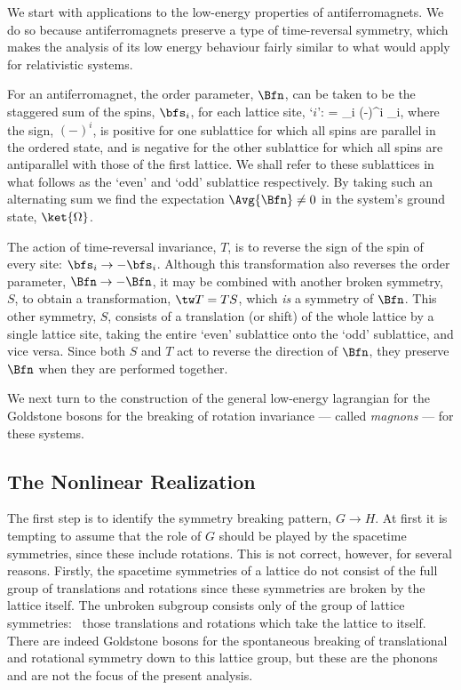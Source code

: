\documentclass[12pt,epsf]{report}
\begin{document}
We start with applications to the low-energy properties of
antiferromagnets. We do so because antiferromagnets
preserve a type of time-reversal symmetry, which makes the
analysis of its low energy behaviour fairly similar to what
would apply for relativistic systems.

For an antiferromagnet, the order parameter, $\Bfn$, can be
taken to be the staggered sum of the spins, $\bfs_i$, for
each lattice site, `$i$':
%
\eq
\label{aforderparam}
\Bfn = \sum_i (-)^i \; \bfs_i,
\eeq
%
where the sign, $(-)^i$, is positive for one sublattice for
which all spins are parallel in the ordered state, and is
negative for the other sublattice for which all spins are
antiparallel with those of the first lattice. We shall
refer to these sublattices in what follows as the `even'
and `odd' sublattice respectively. By taking such an
alternating sum we find the expectation $\Avg{ \Bfn} \neq
0$ in the system's ground state, $\ket{\Omega}$.

The action of time-reversal invariance, $T$, is to reverse
the sign of the spin of every site: $\bfs_i \to - \bfs_i$.
Although this transformation also reverses the order
parameter, $\Bfn \to 
- \Bfn$, it may be combined with another broken symmetry,
$S$, to obtain a transformation, $\tw T = TS$, which {\em
is} a symmetry of $\Bfn$. This other symmetry, $S$,
consists of a translation (or shift) of the whole lattice
by a single lattice site, taking the entire `even'
sublattice onto the `odd' sublattice, and vice versa. Since
both $S$ and $T$ act to reverse the direction of $\Bfn$,
they preserve $\Bfn$ when they are performed together.

We next turn to the construction of the general low-energy
lagrangian for the Goldstone bosons for the breaking of
rotation invariance --- called {\em magnons} --- for these
systems.

\subsection{The Nonlinear Realization}

The first step is to identify the symmetry breaking
pattern, $G \to H$. At first it is tempting to assume that
the role of $G$ should be played by the spacetime
symmetries, since these include rotations. This is not
correct, however, for several reasons. Firstly, the
spacetime symmetries of a lattice do not consist of the
full group of translations and rotations since these
symmetries are broken by the lattice itself. The unbroken
subgroup consists only of the group of lattice symmetries:
\ie\ those translations and rotations which take the
lattice to itself. There are indeed Goldstone bosons for
the spontaneous breaking of translational and rotational
symmetry down to this lattice group, but these are the
phonons and are not the focus of the present analysis.
\end{document}
